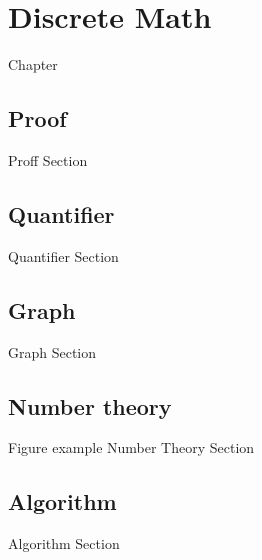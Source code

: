 \chapter{Discrete Math}\label{chp:discrete_math}

Chapter
\blindtext[10]

\section{Proof}

Proff Section

\section{Quantifier}
Quantifier Section

\section{Graph}
Graph Section

\section{Number theory}
Figure example
Number Theory Section

\section{Algorithm}
Algorithm Section
